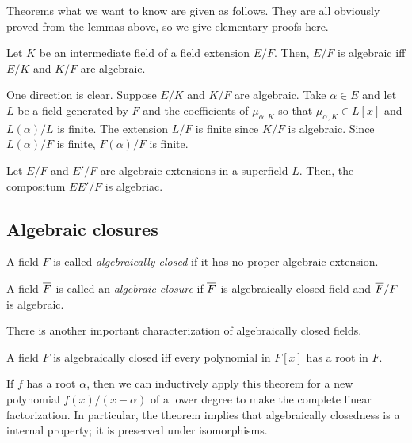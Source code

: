 \documentclass{../exp}
\begin{document}
\begin{rd}
Theorems what we want to know are given as follows.
They are all obviously proved from the lemmas above, so we give elementary proofs here.

\begin{thm}
Let $K$ be an intermediate field of a field extension $E/F$.
Then, $E/F$ is algebraic iff $E/K$ and $K/F$ are algebraic.
\end{thm}
\begin{pf}
One direction is clear.
Suppose $E/K$ and $K/F$ are algebraic.
Take $\alpha\in E$ and let $L$ be a field generated by $F$ and the coefficients of $\mu_{\alpha,K}$ so that $\mu_{\alpha,K}\in L[x]$ and $L(\alpha)/L$ is finite.
The extension $L/F$ is finite since $K/F$ is algebraic.
Since $L(\alpha)/F$ is finite, $F(\alpha)/F$ is finite.
\end{pf}

\begin{thm}
Let $E/F$ and $E'/F$ are algebraic extensions in a superfield $L$.
Then, the compositum $EE'/F$ is algebriac.
\end{thm}
\begin{pf}
\end{pf}










\subsection{Algebraic closures}





\begin{defn}
A field $F$ is called \emph{algebraically closed} if it has no proper algebraic extension.
\end{defn}

\begin{defn}
A field $\overline F$ is called an \emph{algebraic closure} if $\overline F$ is algebraically closed field and $\overline F/F$ is algebraic.
\end{defn}

There is another important characterization of algebraically closed fields.

\begin{thm}
A field $F$ is algebraically closed iff every polynomial in $F[x]$ has a root in $F$.
\end{thm}

If $f$ has a root $\alpha$, then we can inductively apply this theorem for a new polynomial $f(x)/(x-\alpha)$ of a lower degree to make the complete linear factorization.
In particular, the theorem implies that algebraically closedness is a internal property; it is preserved under isomorphisms.





\end{rd}
\end{document}

